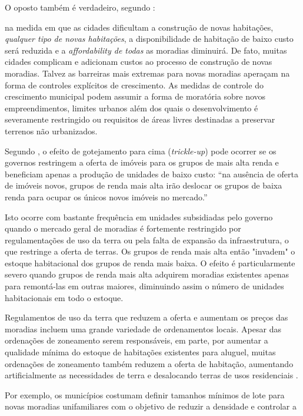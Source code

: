 \documentclass[
	12pt,				%
	oneside,			%
	a4paper,			%
	chapter=TITLE,		%
	section=TITLE,		%
	english,			%
	brazil				%
	]{abntex2}
\begin{document}
\begin{refsection}
O oposto também é verdadeiro, segundo \textcite[p.~205-206]{quigley}:
\begin{citacao} 
na medida em que as cidades dificultam a construção de novas habitações,
\emph{qualquer tipo de novas habitações}, a disponibilidade de habitação de
baixo custo será reduzida e a \emph{affordability de todas} as moradias
diminuirá. De fato, muitas cidades complicam e adicionam custos ao processo
de construção de novas moradias. Talvez as barreiras mais extremas para novas
moradias aperaçam na forma de controles explícitos de crescimento. As medidas de
controle do crescimento municipal podem assumir a forma de moratória sobre novos
empreendimentos, limites urbanos além dos quais o desenvolvimento é severamente
restringido ou requisitos de áreas livres destinadas a preservar terrenos não
urbanizados.
\end{citacao}
Segundo \textcite[p.~241]{bertau}, o efeito de gotejamento para cima (\emph{trickle-up}) pode
ocorrer se os governos restringem a oferta de imóveis para os grupos de mais
alta renda e beneficiam apenas a produção de unidades de baixo custo: ``na
ausência de oferta de imóveis novos, grupos de renda mais alta irão deslocar os
grupos de baixa renda para ocupar os únicos novos imóveis no mercado.''
\begin{citacao}
Isto ocorre com bastante frequência em unidades subsidiadas pelo governo quando
o mercado geral de moradias é fortemente restringido por regulamentações de uso
da terra ou pela falta de expansão da infraestrutura, o que restringe a oferta
de terras. Os grupos de renda mais alta então "invadem" o estoque habitacional
dos grupos de renda mais baixa. O efeito é particularmente severo quando grupos
de renda mais alta adquirem moradias existentes apenas para remontá-las em
outras maiores, diminuindo assim o número de unidades habitacionais em todo o
estoque.
\cite[p.241]{bertaud}
\end{citacao}
Regulamentos de uso da terra que reduzem a oferta e aumentam os preços das
moradias incluem uma grande variedade de ordenamentos locais. Apesar das
ordenações de zoneamento serem responsáveis, em parte, por aumentar a qualidade
mínima do estoque de habitações existentes para aluguel, muitas ordenações de
zoneamento também reduzem a oferta de habitação, aumentando artificialmente as
necessidades de terra e desalocando terras de usos residenciais \autocite[p.
206]{quigley}.
\begin{citacao}
Por exemplo, os municípios costumam definir tamanhos mínimos de lote para novas
moradias unifamiliares com o objetivo de reduzir a densidade e controlar a

\end{citacao}
\end{refsection}
\end{document}
